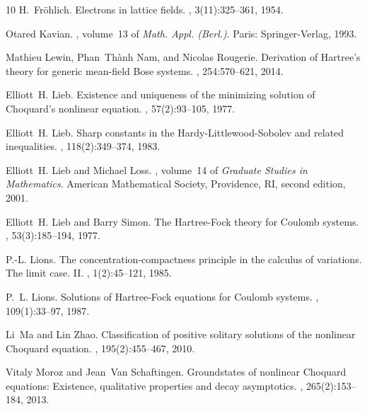 \documentclass[12pt,a4paper]{article}
\numberwithin{equation}{section}
\begin{document}
\begin{thebibliography}{10}
H.~Fröhlich.
\newblock Electrons in lattice fields.
, 3(11):325--361, 1954.

Otared Kavian.
, volume~13 of {\em Math. Appl.
  (Berl.)}.
\newblock Paris: Springer-Verlag, 1993.

Mathieu Lewin, Phan~Th{\`a}nh Nam, and Nicolas Rougerie.
\newblock Derivation of {H}artree's theory for generic mean-field {B}ose
  systems.
, 254:570--621, 2014.

Elliott~H. Lieb.
\newblock Existence and uniqueness of the minimizing solution of {C}hoquard's
  nonlinear equation.
, 57(2):93--105, 1977.

Elliott~H. Lieb.
\newblock Sharp constants in the {H}ardy-{L}ittlewood-{S}obolev and related
  inequalities.
, 118(2):349--374, 1983.

Elliott~H. Lieb and Michael Loss.
, volume~14 of {\em Graduate Studies in Mathematics}.
\newblock American Mathematical Society, Providence, RI, second edition, 2001.

Elliott~H. Lieb and Barry Simon.
\newblock The {H}artree-{F}ock theory for {C}oulomb systems.
, 53(3):185--194, 1977.

P.-L. Lions.
\newblock The concentration-compactness principle in the calculus of
  variations. {T}he limit case. {II}.
, 1(2):45--121, 1985.

P.~L. Lions.
\newblock Solutions of {H}artree-{F}ock equations for {C}oulomb systems.
, 109(1):33--97, 1987.

Li~Ma and Lin Zhao.
\newblock Classification of positive solitary solutions of the nonlinear
  {C}hoquard equation.
, 195(2):455--467,
  2010.

Vitaly Moroz and Jean~Van Schaftingen.
\newblock Groundstates of nonlinear {C}hoquard equations: Existence,
  qualitative properties and decay asymptotics.
, 265(2):153--184, 2013.


\end{thebibliography}
\end{document}
